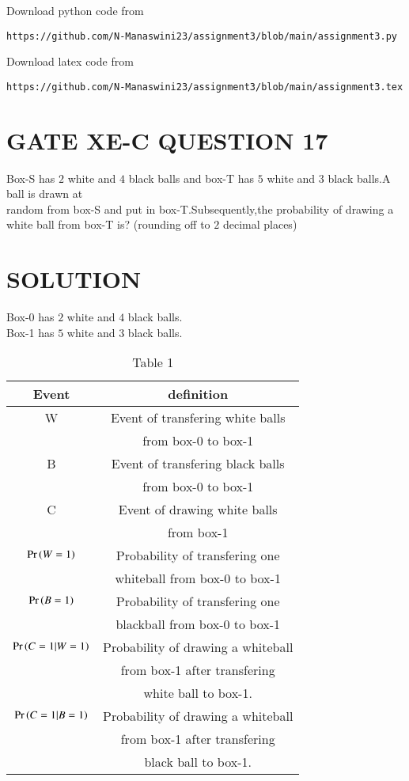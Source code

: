 \documentclass[journal,12pt,twocolumn]{IEEEtran}
\begin{document}
\renewcommand{\thefigure}{\theenumi}
\renewcommand{\thetable}{\theenumi}
Download python code from 
\begin{lstlisting}
https://github.com/N-Manaswini23/assignment3/blob/main/assignment3.py
\end{lstlisting}
%
Download latex code from 
\begin{lstlisting}
https://github.com/N-Manaswini23/assignment3/blob/main/assignment3.tex
\end{lstlisting}
%

\section*{GATE XE-C QUESTION 17}
Box-S has $2$ white and $4$ black balls and box-T has $5$ white and $3$ black balls.A ball is drawn at \\ random from box-S and put in box-T.Subsequently,the probability of drawing a white ball from box-T is? (rounding off to $ 2 $ decimal places)

\section*{SOLUTION}
Box-0 has $2$ white and $4$ black balls.\\
Box-1 has $5$ white and $3$ black balls.\\
\begin{table}[h!]
\resizebox{9.2cm}{!}
{ 
\begin{tabular}{|c|c|}
\hline
Event & definition \\
\hline
W & Event of transfering white balls\\
& from box-0 to box-1\\
\hline
B & Event of transfering black balls \\
&  from box-0 to box-1\\
\hline
C  & Event of drawing white balls\\
& from box-1 \\
\hline
$\Pr\left(W=1\right)$ & Probability of transfering one\\
&  whiteball  from box-0 to box-1 \\
\hline
$\Pr\left(B=1\right)$ &Probability of transfering one \\
& blackball from box-0 to box-1 \\
\hline
$\Pr\left(C=1|W=1\right)$ & Probability of drawing a whiteball\\
&  from box-1 after transfering \\
&white ball to box-1.\\
\hline
$\Pr\left(C=1|B=1\right)$ & Probability of drawing a whiteball\\
& from box-1 after transfering \\
& black ball to box-1.\\
\hline
\end{tabular}
}
\caption{Table 1} 
\label{tab:1}
\end{table}
\end{document}
